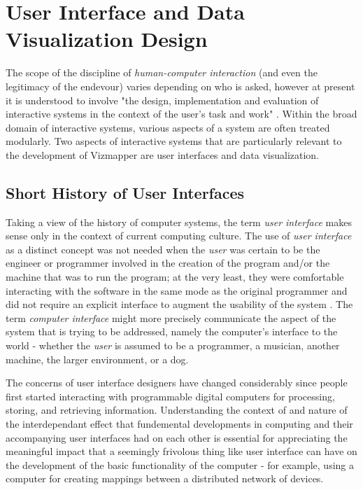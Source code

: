 \resetdatestamp

\chapter{User Interface and Data Visualization Design}

The scope of the discipline of \emph{human-computer interaction} (and even the legitimacy of the endevour) varies depending on who is asked, however at present it is understood to involve "the design, implementation and evaluation of interactive systems in the context of the user's task and work" \cite{hci1998}. Within the broad domain of interactive systems, various aspects of a system are often treated modularly. Two aspects of interactive systems that are particularly relevant to the development of Vizmapper are user interfaces and data visualization.

\section{Short History of User Interfaces}

Taking a view of the history of computer systems, the term \emph{user interface} makes sense only in the context of current computing culture. The use of \emph{user interface} as a distinct concept was not needed when the \emph{user} was certain to be the engineer or programmer involved in the creation of the program and/or the machine that was to run the program; at the very least, they were comfortable interacting with the software in the same mode as the original programmer and did not require an explicit interface to augment the usability of the system \cite{continuity1990}. The term \emph{computer interface} might more precisely communicate the aspect of the system that is trying to be addressed, namely the computer's interface to the world - whether the \emph{user} is assumed to be a programmer, a musician, another machine, the larger environment, or a dog. 

The concerns of user interface designers have changed considerably since people first started interacting with programmable digital computers for processing, storing, and retrieving information. Understanding the context of and nature of the interdependant effect that fundemental developments in computing and their accompanying user interfaces had on each other is essential for appreciating the meaningful impact that a seemingly frivolous thing like user interface can have on the development of the basic functionality of the computer - for example, using a computer for creating mappings between a distributed network of devices.  

